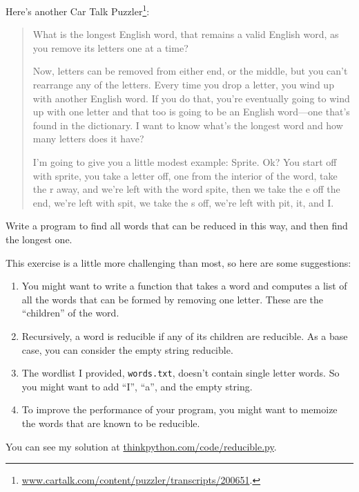 \documentclass[10pt]{book}
\begin{document}
\begin{ex}


Here's another Car Talk Puzzler\footnote{
\url{www.cartalk.com/content/puzzler/transcripts/200651}.}:

\begin{quote}
What is the longest English word, that remains a valid English word,
as you remove its letters one at a time?

Now, letters can be removed from either end, or the middle, but you
can't rearrange any of the letters. Every time you drop a letter, you
wind up with another English word. If you do that, you're eventually
going to wind up with one letter and that too is going to be an
English word---one that's found in the dictionary. I want to know
what's the longest word and how many letters does it
have?

I'm going to give you a little modest example: Sprite. Ok? You start
off with sprite, you take a letter off, one from the interior of the
word, take the r away, and we're left with the word spite, then we
take the e off the end, we're left with spit, we take the s off, we're
left with pit, it, and I.
\end{quote}


Write a program to find all words that can be reduced in this way,
and then find the longest one.

This exercise is a little more challenging than most, so here are
some suggestions:

\begin{enumerate}

\item You might want to write a function that takes a word and
  computes a list of all the words that can be formed by removing one
  letter.  These are the ``children'' of the word.


\item Recursively, a word is reducible if any of its children
are reducible.  As a base case, you can consider the empty
string reducible.

\item The wordlist I provided, {\tt words.txt}, doesn't
contain single letter words.  So you might want to add
``I'', ``a'', and the empty string.

\item To improve the performance of your program, you might want
to memoize the words that are known to be reducible.

\end{enumerate}

You can see my solution at \url{thinkpython.com/code/reducible.py}.

\end{ex}
\end{document}
